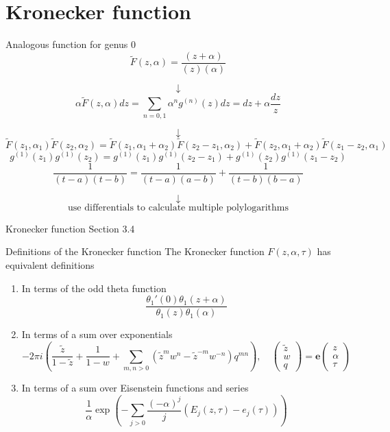 \documentclass[11pt,aspectratio=169]{beamer}
\newcommand{\ee}[0]{\mathbf{e}}
\begin{document}
\section{Kronecker function}

\begin{frame}{Analogous function for genus 0}
    \[\tilde F(z,\alpha) = \frac{(z+\alpha)}{(z)(\alpha)}\]


    \[\downarrow\]
    \[\alpha \tilde F(z,\alpha) dz = \sum_{n=0,1} \alpha^n g^{(n)}(z) dz = dz + \alpha \frac{dz}{z}\]
    
    
    \[\downarrow\]
    \[\tilde{F}(z_1,\alpha_1)\tilde{F}(z_2,\alpha_2) = \tilde{F}(z_1,\alpha_1+\alpha_2)\tilde{F}(z_2-z_1,\alpha_2) + \tilde{F}(z_2,\alpha_1+\alpha_2)\tilde{F}(z_1-z_2,\alpha_1)\]
    \[g^{(1)}(z_1)g^{(1)}(z_2) = g^{(1)}(z_1)g^{(1)}(z_2-z_1) + g^{(1)}(z_2)g^{(1)}(z_1-z_2)\]
    \[\frac{1}{(t-a)(t-b)} = \frac{1}{(t-a)(a-b)} + \frac{1}{(t-b)(b-a)}\]
    
    
    \[\downarrow\]
    \[\text{use differentials to calculate multiple polylogarithms}\]
\end{frame}

\begin{frame}{Kronecker function}{\tiny \cite{BL13} Section 3.4}
    \begin{block}{Definitions of the Kronecker function}
        The Kronecker function $F(z,\alpha,\tau)$ has equivalent definitions
        \begin{enumerate}
            \item In terms of the odd theta function
            \[\frac{\theta_1'(0)\theta_1(z+\alpha)}{\theta_1(z)\theta_1(\alpha)}\]
            \item In terms of a sum over exponentials
            \[-2\pi i \left(\frac{\tilde z}{1-\tilde z} + \frac{1}{1-w} + \sum_{m,n > 0} (\tilde z^m w^n - \tilde z^{-m} w^{-n}) q^{mn}\right) , \quad \begin{pmatrix} \tilde z \\ w \\ q \end{pmatrix} = \ee \begin{pmatrix}z \\ \alpha \\ \tau\end{pmatrix}\]
            \item In terms of a sum over Eisenstein functions and series
            \[\frac{1}{\alpha} \exp\left(-\sum_{j > 0} \frac{(-\alpha)^j}{j} (E_j(z,\tau) - e_j(\tau))\right)\]
        \end{enumerate}
    \end{block}
\end{frame}
\end{document}
